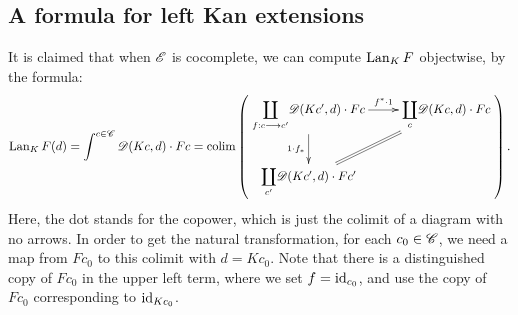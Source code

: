 \documentclass[11pt]{article}
\begin{document}
\begin{2. Kan Extensions}
\subsection*{A formula for left Kan extensions}
It is claimed that when $\mathscr{E}$ is cocomplete, we can compute $\operatorname{Lan}_KF$ objectwise, by the formula:
\[\Lan_KF(d)= \int^{c\in\scrC}\scrD(Kc,d)\cdot Fc=
\colim\left(\vcenter{\xymatrix{
{\displaystyle\coprod_{f:c\to c'}}\scrD(Kc',d)\cdot Fc\ar[r]^-{f^*\cdot1}\ar[d]_-{1\cdot f_*}&%
{\displaystyle\coprod_{c}}\scrD(Kc,d)\cdot Fc\ar@{=}[ld]\\%
{\displaystyle\coprod_{c'}}\scrD(Kc',d)\cdot Fc'&%
}}\right)
.\]
Here, the dot stands for the copower, which is just the colimit of a diagram with no arrows. In order to get the natural transformation, for each $c_0\in\mathscr{C}$, we need a map from $Fc_0$ to this colimit with $d=Kc_0$. 
Note that there is a distinguished copy of $Fc_0$ in the upper left term, where we set $f=\textup{id}_{c_0}$, and use the copy of $Fc_0$  corresponding to $\textup{id}_{Kc_0}$.


\end{2. Kan Extensions}
\end{document}
